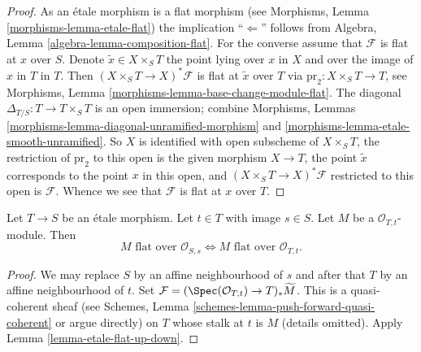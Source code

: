 \begin{proof}
As an \'etale morphism is a flat morphism (see
Morphisms, Lemma \ref{morphisms-lemma-etale-flat})
the implication ``$\Leftarrow$'' follows from
Algebra, Lemma \ref{algebra-lemma-composition-flat}.
For the converse assume that $\mathcal{F}$ is flat at $x$ over $S$.
Denote $\tilde x \in X \times_S T$ the point lying over $x$ in $X$
and over the image of $x$ in $T$ in $T$.
Then $(X \times_S T \to X)^*\mathcal{F}$ is flat at $\tilde x$ over $T$
via $\text{pr}_2 : X \times_S T \to T$, see
Morphisms, Lemma \ref{morphisms-lemma-base-change-module-flat}.
The diagonal $\Delta_{T/S} : T \to T \times_S T$ is an open immersion;
combine
Morphisms, Lemmas \ref{morphisms-lemma-diagonal-unramified-morphism} and
\ref{morphisms-lemma-etale-smooth-unramified}.
So $X$ is identified with open subscheme of $X \times_S T$,
the restriction of $\text{pr}_2$ to this open is the given morphism $X \to T$,
the point $\tilde x$ corresponds to the point $x$ in this open, and
$(X \times_S T \to X)^*\mathcal{F}$ restricted to this open is $\mathcal{F}$.
Whence we see that $\mathcal{F}$ is flat at $x$ over $T$.
\end{proof}

\begin{lemma}
\label{lemma-etale-flat-up-down-local-ring}
Let $T \to S$ be an \'etale morphism. Let $t \in T$ with image $s \in S$.
Let $M$ be a $\mathcal{O}_{T, t}$-module. Then
$$
M\text{ flat over }\mathcal{O}_{S, s}
\Leftrightarrow
M\text{ flat over }\mathcal{O}_{T, t}.
$$
\end{lemma}

\begin{proof}
We may replace $S$ by an affine neighbourhood of $s$ and after that
$T$ by an affine neighbourhood of $t$.
Set $\mathcal{F} = (\Spec(\mathcal{O}_{T, t}) \to T)_*\widetilde M$.
This is a quasi-coherent sheaf (see
Schemes, Lemma \ref{schemes-lemma-push-forward-quasi-coherent}
or argue directly)
on $T$ whose stalk at $t$ is $M$ (details omitted).
Apply
Lemma \ref{lemma-etale-flat-up-down}.
\end{proof}

